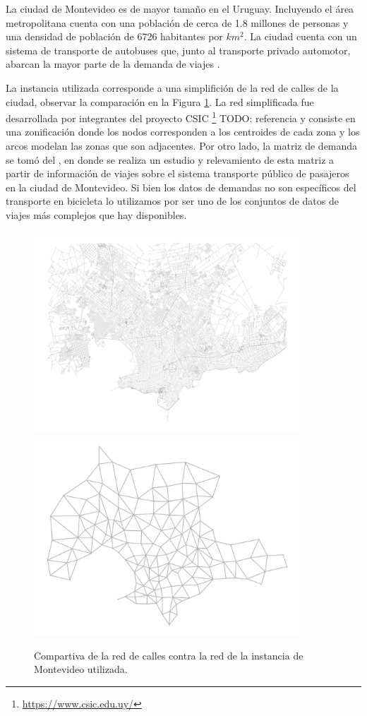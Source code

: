 La ciudad de Montevideo es de mayor tamaño en el Uruguay. Incluyendo el área metropolitana cuenta con una población de cerca de 1.8 millones de personas y una densidad de población de 6726 habitantes por $km^2$. La ciudad cuenta con un sistema de transporte de autobuses que, junto al transporte privado automotor, abarcan la mayor parte de la demanda de viajes \cite{Mauttone2017a}.

La instancia utilizada corresponde a una simplifición de la red de calles de la ciudad, observar la comparación en la Figura \ref{fig:montevideosimplification}. La red simplificada fue desarrollada por integrantes del proyecto CSIC \footnote{\url{https://www.csic.edu.uy/}} TODO: referencia y consiste en una zonificación donde los nodos corresponden a los centroides de cada zona y los arcos modelan las zonas que son adjacentes. Por otro lado, la matriz de demanda se tomó del \cite{Massobrio2020}, en donde se realiza un estudio y relevamiento de esta matriz a partir de información de viajes sobre el sistema transporte público de pasajeros en la ciudad de Montevideo. Si bien los datos de demandas no son específicos del transporte en bicicleta lo utilizamos por ser uno de los conjuntos de datos de viajes más complejos que hay disponibles.

\begin{figure}[h!]
  \centering
  \includegraphics[width=10cm]{../resources/montevideo_full.png}
  \includegraphics[width=10cm]{../resources/montevideo_simple.png}
  \caption{Compartiva de la red de calles contra la red de la instancia de Montevideo utilizada.}
  \label{fig:montevideosimplification}
\end{figure}

